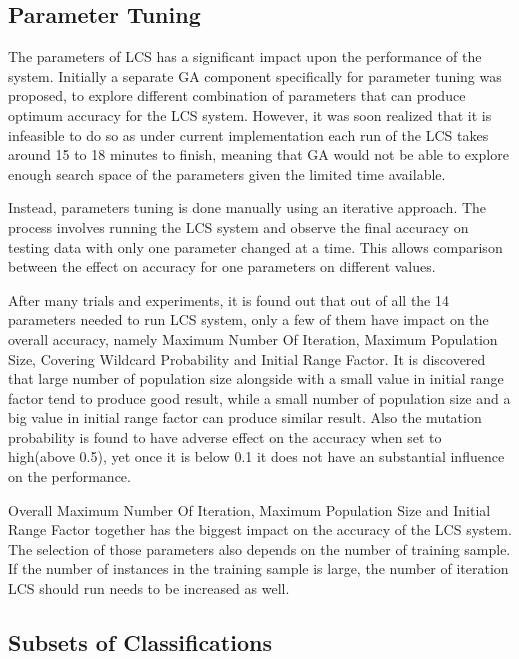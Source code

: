 \documentclass[11pt]{article}
\begin{document}
\subsection{Parameter Tuning}
\label{sec:paramTune}

The parameters of LCS has a significant impact upon the performance of the system. Initially a separate GA component specifically for parameter tuning was proposed, to explore different combination of parameters that can produce optimum accuracy for the LCS system. However, it was soon realized that it is infeasible to do so as under current implementation each run of the LCS takes around 15 to 18 minutes to finish, meaning that GA would not be able to explore enough search space of the parameters given the limited time available.

Instead, parameters tuning is done manually using an iterative approach. The process involves running the LCS system and observe the final accuracy on testing data with only one parameter changed at a time. This allows comparison between the effect on accuracy for one parameters on different values.

After many trials and experiments, it is found out that out of all the 14 parameters needed to run LCS system, only a few of them have impact on the overall accuracy, namely Maximum Number Of Iteration, Maximum Population Size, Covering Wildcard Probability and Initial Range Factor. It is discovered that large number of population size alongside with a small value in initial range factor tend to produce good result, while a small number of population size and a big value in initial range factor can produce similar result. Also the mutation probability is found to have adverse effect on the accuracy when set to high(above 0.5), yet once it is below 0.1 it does not have an substantial influence on the performance.

Overall Maximum Number Of Iteration, Maximum Population Size and Initial Range Factor together has the biggest impact on the accuracy of the LCS system. The selection of those parameters also depends on the number of training sample. If the number of instances in the training sample is large, the number of iteration LCS should run needs to be increased as well.



\subsection{Subsets of Classifications}
\label{sec:subsets}
\end{document}
